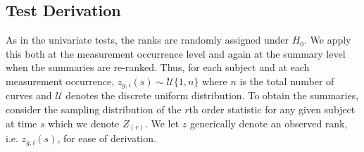 \documentclass[12pt]{article}
\theoremstyle{plain}
\begin{document}
		\subsection{Test Derivation}
	
	As in the univariate tests, the ranks are randomly assigned under $H_0$. We apply this both at the measurement occurrence level and again at the summary level when the summaries are re-ranked. Thus, for each subject and at each measurement occurrence, $z_{g,i}(s) \sim \mathcal{U}\{1,n\}$ where $n$ is the total number of curves and $\mathcal{U}$ denotes the discrete uniform distribution. To obtain the summaries, consider the sampling distribution of the $r$th order statistic for any given subject at time $s$ which we denote $Z_{(r)}$. We let $z$ generically denote an observed rank, i.e. $z_{g,i}(s)$, for ease of derivation.
\end{document}
